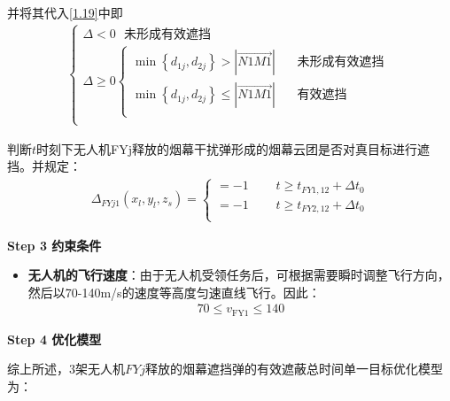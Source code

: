\documentclass[../main.tex]{subfiles}
\begin{document}
\begin{itemize}
并将其代入\eqref{1.19}中即
\begin{align}\label{1.98}
	\left\{ \begin{array}{l}
	\varDelta <0\ \ \ \text{未形成有效遮挡}\\
	\varDelta \ge 0\left\{ \begin{array}{l}
	\min \left\{ d_{1j},d_{2j} \right\} >\left| \overrightarrow{N1M1} \right|\ \ \ \ \ \ \ \ \text{未形成有效遮挡}\\
	\min \left\{ d_{1j},d_{2j} \right\} \le \left| \overrightarrow{N1M1} \right|\ \ \ \ \ \ \ \ \text{有效遮挡}\\
\end{array} \right.\\
\end{array} \right. 
\end{align}
\par 判断$t$时刻下无人机FYj释放的烟幕干扰弹形成的烟幕云团是否对真目标进行遮挡。并规定： 
\begin{align}\label{14.9}
	\Delta _{FYj1}\left( x_l,y_l,z_s \right) =\left\{ \begin{array}{l}
	=-1\ \ \ \ \ \ \ \ \ \ t\ge t_{FY1,12}+\Delta t_0\\
	=-1\ \ \ \ \ \ \ \ \ \ t\ge t_{FY2,12}+\Delta t_0\\
\end{array} \right.
\end{align}
\end{itemize}

\textbf{Step 3 约束条件}
\begin{itemize}
\item \textbf{无人机的飞行速度}：由于无人机受领任务后，可根据需要瞬时调整飞行方向，然后以70-140m/s的速度等高度匀速直线飞行。因此：
\begin{align}\label{11.8}
  70 \leq v_{\text{FY1}} \leq 140
\end{align}
\end{itemize}
\textbf{Step 4 优化模型}
\par 综上所述，3架无人机$FYj$释放的烟幕遮挡弹的有效遮蔽总时间单一目标优化模型为：
\end{document}
